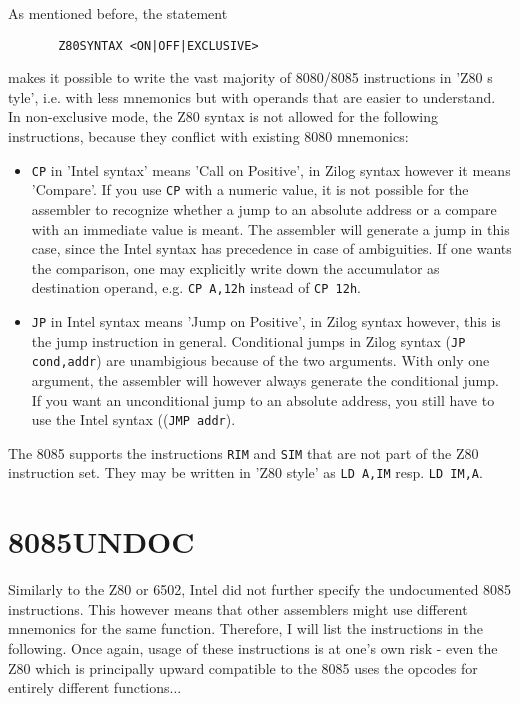 \documentclass[12pt,twoside]{report}
\newcommand{\tty}[1]{{\tt #1}}
\begin{document}
As mentioned before, the statement
\begin{verbatim}
       Z80SYNTAX <ON|OFF|EXCLUSIVE>
\end{verbatim}
makes it possible to write the vast majority of 8080/8085
instructions in 'Z80 s		tyle', i.e. with less mnemonics but with
operands that are easier to understand.  In non-exclusive mode,
the Z80 syntax is not allowed for the following instructions,
because they conflict with existing 8080 mnemonics:
\begin{itemize}
\item{\tty{CP} in 'Intel syntax' means 'Call on Positive', in
      Zilog syntax however it means 'Compare'.  If you use
      \tty{CP} with a numeric value, it is not possible for the
      assembler to recognize whether a jump to an absolute
      address or a compare with an immediate value is meant.
      The assembler will generate a jump in this case, since the
      Intel syntax has precedence in case of ambiguities. If
      one wants the comparison, one may explicitly write down the
      accumulator as destination operand, e.g. \tty{CP A,12h}
      instead of \tty{CP 12h}.}
\item{\tty{JP} in Intel syntax means 'Jump on Positive', in Zilog
      syntax however, this is the jump instruction in general.
      Conditional jumps in Zilog syntax (\tty{JP cond,addr}) are
      unambigious because of the two arguments.  With only one
      argument, the assembler will however always generate the
      conditional jump.  If you want an unconditional jump to
      an absolute address, you still have to use the Intel syntax
      ((\tty{JMP addr}).}
\end{itemize}
The 8085 supports the instructions \tty{RIM} and \tty{SIM} that are
not part of the Z80 instruction set.  They may be written in 'Z80 style'
as \tty{LD A,IM} resp. \tty{LD IM,A}.


\section{8085UNDOC}
\label{8085Spec}

Similarly to the Z80 or 6502, Intel did not further specify the
undocumented 8085 instructions.  This however means that other assemblers
might use different mnemonics for the same function.  Therefore, I will
list the instructions in the following.  Once again, usage of these
instructions is at one's own risk - even the Z80 which is principally
upward compatible to the 8085 uses the opcodes for entirely different
functions...
\end{document}
